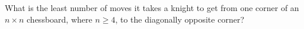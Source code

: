 What is the least number of moves it takes a knight to get from one corner of an $n\times n$ chessboard, where $n\ge 4$,  to the diagonally opposite corner?